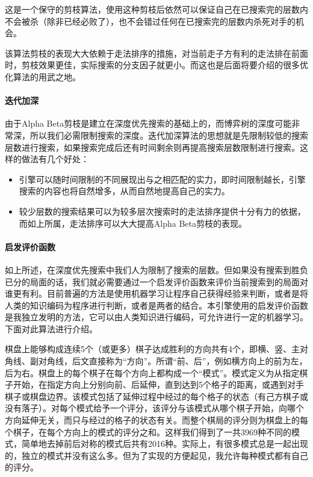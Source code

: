 \documentclass{article}
\begin{document}
这是一个保守的剪枝算法，使用这种剪枝后依然可以保证自己在已搜索完的层数内不会被杀（除非已经必败了），也不会错过任何在已搜索完的层数内杀死对手的机会。

该算法剪枝的表现大大依赖于走法排序的措施，对当前走子方有利的走法排在前面时，剪枝效果更佳，实际搜索的分支因子就更小。而这也是后面将要介绍的很多优化算法的用武之地。

\paragraph{迭代加深} 由于Alpha Beta剪枝是建立在深度优先搜索的基础上的，而博弈树的深度可能非常深，所以我们必需限制搜索的深度。迭代加深算法的思想就是先限制较低的搜索层数进行搜索，如果搜索完成后还有时间剩余则再提高搜索层数限制进行搜索。这样的做法有几个好处：
\begin{itemize}
    \item 引擎可以随时间限制的不同展现出与之相匹配的实力，即时间限制越长，引擎搜索的内容也将自然增多，从而自然地提高自己的实力。
    \item 较少层数的搜索结果可以为较多层次搜索时的走法排序提供十分有力的依据，而如上所属，走法排序可以大大提高Alpha Beta剪枝的表现。
\end{itemize}

\paragraph{启发评价函数} 如上所述，在深度优先搜索中我们人为限制了搜索的层数。但如果没有搜索到胜负已分的局面的话，我们就必需要通过一个启发评价函数来评价当前搜索到的局面对谁更有利。目前普遍的方法是使用机器学习让程序自己获得经验来判断，或者是将人类的知识编码为程序进行判断，或者是两者的结合。本引擎使用的启发评价函数是我独立发明的方法，它可以由人类知识进行编码，可允许进行一定的机器学习。下面对此算法进行介绍。

棋盘上能够构成连续5个（或更多）棋子达成胜利的方向共有4个，即横、竖、主对角线、副对角线，后文直接称为“方向”。所谓“前、后”，例如横方向上的前为左，后为右。棋盘上的每个棋子在每个方向上都构成一个“模式”。模式定义为从指定棋子开始，在指定方向上分别向前、后延伸，直到达到5个格子的距离，或遇到对手棋子或棋盘边界。该模式包括了延伸过程中经过的每个格子的状态（有己方棋子或没有落子）。对每个模式给予一个评分，该评分与该模式从哪个棋子开始，向哪个方向延伸无关，而只与经过的格子的状态有关。而整个棋局的评分则为棋盘上的每个棋子，在每个方向上的模式的评分之和。这样我们得到了一共3969种不同的模式，简单地去掉前后对称的模式后共有2016种。实际上，有很多模式总是一起出现的，独立的模式并没有这么多。但为了实现的方便起见，我允许每种模式都有自己的评分。
\end{document}
